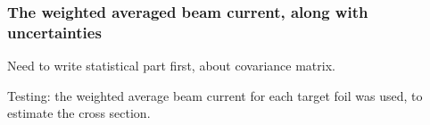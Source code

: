 \documentclass[a4paper,11pt,twoside]{book}
\begin{document}


\subsubsection{The weighted averaged beam current, along with uncertainties}

Need to write statistical part first, about covariance matrix. 


Testing: the weighted average beam current for each target foil was used, to estimate the cross section. 
\end{document}
